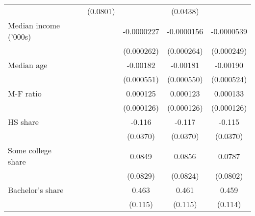 {\begin{tabular}{l*{6}{c}}
                    &                     &                     &    (0.0801)         &                     &    (0.0438)         &                     \\
\addlinespace
Median income ('000s)&                     &                     &                     &  -0.0000227         &  -0.0000156         &  -0.0000539         \\
                    &                     &                     &                     &  (0.000262)         &  (0.000264)         &  (0.000249)         \\
\addlinespace
Median age          &                     &                     &                     &    -0.00182\sym{***}&    -0.00181\sym{***}&    -0.00190\sym{***}\\
                    &                     &                     &                     &  (0.000551)         &  (0.000550)         &  (0.000524)         \\
\addlinespace
M-F ratio           &                     &                     &                     &    0.000125         &    0.000123         &    0.000133         \\
                    &                     &                     &                     &  (0.000126)         &  (0.000126)         &  (0.000126)         \\
\addlinespace
HS share            &                     &                     &                     &      -0.116\sym{***}&      -0.117\sym{***}&      -0.115\sym{***}\\
                    &                     &                     &                     &    (0.0370)         &    (0.0370)         &    (0.0370)         \\
\addlinespace
Some college share  &                     &                     &                     &      0.0849         &      0.0856         &      0.0787         \\
                    &                     &                     &                     &    (0.0829)         &    (0.0824)         &    (0.0802)         \\
\addlinespace
Bachelor's share    &                     &                     &                     &       0.463\sym{***}&       0.461\sym{***}&       0.459\sym{***}\\
                    &                     &                     &                     &     (0.115)         &     (0.115)         &     (0.114)         \\

\end{tabular}}
